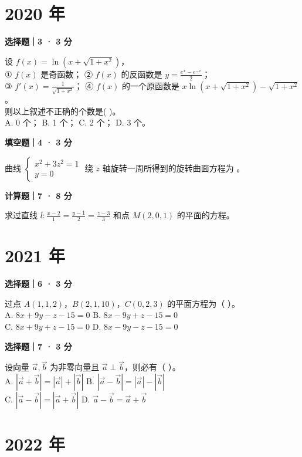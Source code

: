 

\section*{2020 年}


\textbf{选择题｜3 · 3 分}

设 $f(x) = \ln(x + \sqrt{1 + x^2})$，\\
① $f(x)$ 是奇函数； \quad ② $f(x)$ 的反函数是 $y = \frac{e^x-e^{-x}}{2}$；\\
③ $f'(x) = \frac{1}{\sqrt{1+x^2}}$； \quad ④ $f(x)$ 的一个原函数是 $x \ln(x + \sqrt{1 + x^2}) - \sqrt{1 + x^2}$。\\
则以上叙述不正确的个数是( \quad )。\\
A. 0 个； \quad B. 1 个； \quad C. 2 个； \quad D. 3 个。


\textbf{填空题｜4 · 3 分}

曲线 $\begin{cases} x^2 + 3z^2 = 1 \\ y = 0 \end{cases}$ 绕 $z$ 轴旋转一周所得到的旋转曲面方程为 \underline{\hspace{3cm}}。


\textbf{计算题｜7 · 8 分}

求过直线 $l: \frac{x-2}{1} = \frac{y-1}{2} = \frac{z-3}{3}$ 和点 $M(2,0,1)$ 的平面的方程。


\section*{2021 年}


\textbf{选择题｜6 · 3 分}

过点 $A(1,1, 2)$，$B(2,1,10)$，$C(0,2,3)$ 的平面方程为（ \quad ）。\\
A. $8x + 9y - z - 15 = 0$ \quad B. $8x - 9y + z - 15 = 0$\\
C. $8x + 9y + z - 15 = 0$ \quad D. $8x - 9y - z - 15 = 0$


\textbf{选择题｜7 · 3 分}

设向量 $\vec{a}, \vec{b}$ 为非零向量且 $\vec{a} \perp \vec{b}$，则必有（ \quad ）。\\
A. $|\vec{a} + \vec{b}| = |\vec{a}| + |\vec{b}|$ \quad B. $|\vec{a} - \vec{b}| = |\vec{a}| - |\vec{b}|$\\
C. $|\vec{a} - \vec{b}| = |\vec{a} + \vec{b}|$ \quad D. $\vec{a} - \vec{b} = \vec{a} + \vec{b}$


\section*{2022 年}


